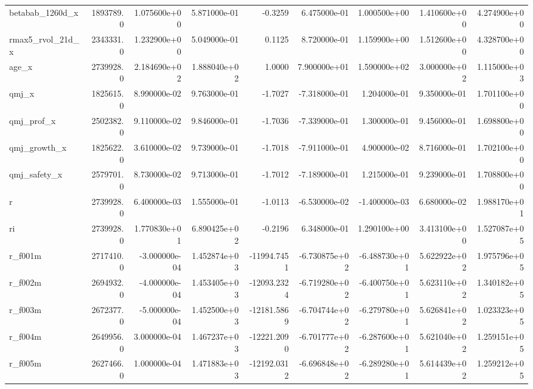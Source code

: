 \documentclass[10pt]{article}
\begin{document}
\begin{landscape}
\begin{longtable}{|l|r|r|r|r|r|r|r|r|}
betabab\_1260d\_x         &  1893789.0 &  1.075600e+00 &  5.871000e-01 &     -0.3259 &  6.475000e-01 &  1.000500e+00 &  1.410600e+00 &  4.274900e+00 \\
rmax5\_rvol\_21d\_x        &  2343331.0 &  1.232900e+00 &  5.049000e-01 &      0.1125 &  8.720000e-01 &  1.159900e+00 &  1.512600e+00 &  4.328700e+00 \\
age\_x                   &  2739928.0 &  2.184690e+02 &  1.888040e+02 &      1.0000 &  7.900000e+01 &  1.590000e+02 &  3.000000e+02 &  1.115000e+03 \\
qmj\_x                   &  1825615.0 &  8.990000e-02 &  9.763000e-01 &     -1.7027 & -7.318000e-01 &  1.204000e-01 &  9.350000e-01 &  1.701100e+00 \\
qmj\_prof\_x              &  2502382.0 &  9.110000e-02 &  9.846000e-01 &     -1.7036 & -7.339000e-01 &  1.300000e-01 &  9.456000e-01 &  1.698800e+00 \\
qmj\_growth\_x            &  1825622.0 &  3.610000e-02 &  9.739000e-01 &     -1.7018 & -7.911000e-01 &  4.900000e-02 &  8.716000e-01 &  1.702100e+00 \\
qmj\_safety\_x            &  2579701.0 &  8.730000e-02 &  9.713000e-01 &     -1.7012 & -7.189000e-01 &  1.215000e-01 &  9.239000e-01 &  1.708800e+00 \\
r                       &  2739928.0 &  6.400000e-03 &  1.555000e-01 &     -1.0113 & -6.530000e-02 & -1.400000e-03 &  6.680000e-02 &  1.988170e+01 \\
ri                      &  2739928.0 &  1.770830e+01 &  6.890425e+02 &     -0.2196 &  6.348000e-01 &  1.290100e+00 &  3.413100e+00 &  1.527087e+05 \\
r\_f001m                 &  2717410.0 & -3.000000e-04 &  1.452874e+03 & -11994.7451 & -6.730875e+02 & -6.488730e+01 &  5.622922e+02 &  1.975796e+05 \\
r\_f002m                 &  2694932.0 & -4.000000e-04 &  1.453405e+03 & -12093.2324 & -6.719280e+02 & -6.400750e+01 &  5.623110e+02 &  1.340182e+05 \\
r\_f003m                 &  2672377.0 & -5.000000e-04 &  1.452500e+03 & -12181.5869 & -6.704744e+02 & -6.279780e+01 &  5.626841e+02 &  1.023323e+05 \\
r\_f004m                 &  2649956.0 &  3.000000e-04 &  1.467237e+03 & -12221.2090 & -6.701777e+02 & -6.287600e+01 &  5.621040e+02 &  1.259151e+05 \\
r\_f005m                 &  2627466.0 &  1.000000e-04 &  1.471883e+03 & -12192.0312 & -6.696848e+02 & -6.289280e+01 &  5.614439e+02 &  1.259212e+05 \\

\end{longtable}
\end{landscape}
\end{document}
